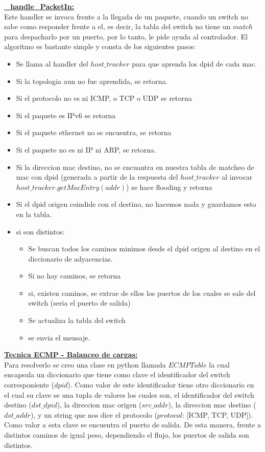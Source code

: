 	\underline{\textbf{\_handle\_PacketIn:}}\\
		Este handler se invoca frente a la llegada de un paquete, cuando un switch no sabe como responder frente a el, es decir, la 			tabla del switch no tiene un $match$ para despacharlo por un puerto, por lo tanto, le pide ayuda al controlador. El algoritmo 			es bastante simple y consta de los siguientes pasos:
		\begin{itemize}
			\item Se llama al handler del $host\_tracker$ para que aprenda los dpid de cada mac.
			\item Si la topologia aun no fue aprendida, se retorna.
			\item Si el protocolo no es ni ICMP, o TCP o UDP se retorna
			\item Si el paquete es IPv6 se retorna
			\item Si el paquete ethernet no se encuentra, se retorna
			\item Si el paquete no es ni IP ni ARP, se retorna.
			\item Si la direccion mac destino, no se encuantra en nuestra tabla de matcheo de mac con dpid (generada a partir de la 			respuesta del $host\_tracker$ al invocar $host\_tracker.getMacEntry(addr)$) se hace flooding y retorna
			\item Si el dpid origen coindide con el destino, no hacemos nada y guardamos esto en la tabla.
			\item si son distintos:
			\begin{itemize}
				\item Se buscan todos los caminos minimos desde el dpid origen al destino en el diccionario de adyacencias.
				\item Si no hay caminos, se retorna
				\item si, existen caminos, se extrae de ellos los puertos de los cuales se sale del switch (seria el puerto de 					salida)
				\item Se actualiza la tabla del switch
				\item se envia el mensaje.
			\end{itemize}
		\end{itemize}
	\underline{\textbf{Tecnica ECMP - Balanceo de cargas:}}\\
		Para resolverlo se creo una clase en python llamada $ECMPTable$ la cual encapsula un diccionario que tiene como clave el 			identificador del switch corresponiente ($dpid$). Como valor de este identificador tiene otro diccionario en el cual su clave 			se una tupla de valores los cuales son, el identificador del switch destino ($dst\_dpid$), la direccion mac origen 
		($src\_addr$), la direccion mac destino ($dst\_addr$), y un string que nos dice el protocolo ($protocol$: [ICMP, TCP, UDP]). 			Como valor a esta clave se encuentra el puerto de salida. De esta manera, frente a distintos caminos de igual peso, dependiendo 		el flujo, los puertos de salida son distintos.

